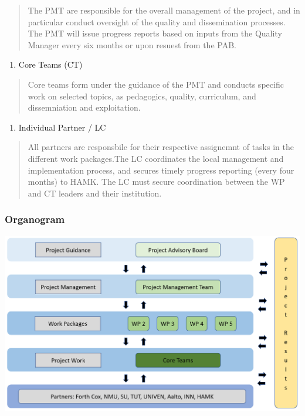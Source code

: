 \documentclass[
  11pt,
]{article}
\providecommand{\tightlist}{%
  \setlength{\itemsep}{0pt}\setlength{\parskip}{0pt}}
\begin{document}
\begin{quote}
The PMT are responsible for the overall management of the project, and
in particular conduct oversight of the quality and dissemination
processes. The PMT will issue progress reports based on inputs from the
Quality Manager every six months or upon resuest from the PAB.
\end{quote}

\begin{enumerate}
\def\labelenumi{\arabic{enumi}.}
\setcounter{enumi}{2}
\tightlist
\item
  Core Teams (CT)
\end{enumerate}

\begin{quote}
Core teams form under the guidance of the PMT and conducts specific work
on selected topics, as pedagogics, quality, curriculum, and
dissemniation and exploitation.
\end{quote}

\begin{enumerate}
\def\labelenumi{\arabic{enumi}.}
\setcounter{enumi}{3}
\tightlist
\item
  Individual Partner / LC
\end{enumerate}

\begin{quote}
All partners are responsbile for their respective assignemnt of tasks in
the different work packages.The LC coordinates the local management and
implementation process, and secures timely progress reporting (every
four months) to HAMK. The LC must secure coordination between the WP and
CT leaders and their institution.
\end{quote}

\hypertarget{organogram}{%
\subsubsection{Organogram}\label{organogram}}

\includegraphics{Organogram.png} \clearpage
\end{document}
